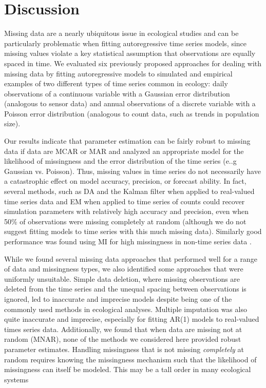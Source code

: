 \documentclass{article}
\begin{document}
\section*{Discussion}

 Missing data are a nearly ubiquitous issue in ecological studies and can be particularly problematic when fitting autoregressive time series models, since missing values violate a key statistical assumption that observations are equally spaced in time. We evaluated six previously proposed approaches for dealing with missing data by fitting autoregressive models to simulated and empirical examples of two different types of time series common in ecology: daily observations of a continuous variable with a Gaussian error distribution (analogous to sensor data) and annual observations of a discrete variable with a Poisson error distribution (analogous to count data, such as trends in population size). 
 
Our results indicate that parameter estimation can be fairly robust to missing data if data are MCAR or MAR and analyzed an appropriate model for the likelihood of missingness and the error distribution of the time series (e..g Gaussian vs. Poisson). Thus, missing values in time series do not necessarily have a catastrophic effect on model accuracy, precision, or forecast ability. In fact, several methods, such as DA and the Kalman filter when applied to real-valued time series data and EM when applied to time series of counts could recover simulation parameters with relatively high accuracy and precision, even when 50\% of observations were missing completely at random (although we do not suggest fitting models to time series with this much missing data). Similarly good performance was found using MI for high missingness in non-time series data \citep{graham_missing_2009}. 

While we found several missing data approaches that performed well for a range of data and missingness types, we also identified some approaches that were uniformly unsuitable. Simple data deletion, where missing observations are deleted from the time series and the unequal spacing between observations is ignored, led to inaccurate and imprecise models despite being one of the commonly used methods in ecological analyses. Multiple imputation was also quite inaccurate and imprecise, especially for fitting AR(1) models to real-valued times series data. Additionally, we found that when data are missing not at random (MNAR), none of the methods we considered here provided robust parameter estimates. Handling missingness that is not missing \textit{completely} at random requires knowing the missingness mechanism such that the likelihood of missingness can itself be modeled. This may be a tall order in many ecological systems  \citep[e.g.,][]{Sotto2011_mnar, McCall2014_mnar, Shoari2018_mnar} %
\end{document}
